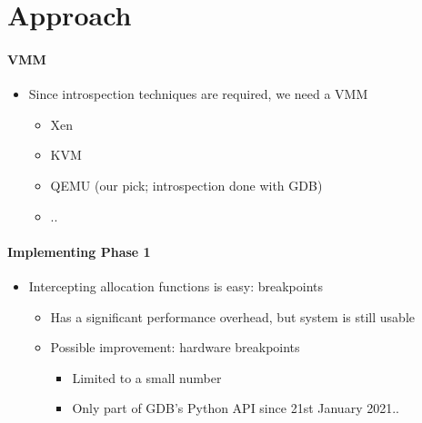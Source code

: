 \documentclass{i20lecture}
\begin{document}
\section{Approach}
\begin{frame}{\insertsection}
  \framesubtitle{VMM}
  
  \begin{itemize}
   \item Since introspection techniques are required, we need a VMM
\pause
    \begin{itemize}
    \item Xen
    \item KVM
    \item QEMU (our pick; introspection done with GDB)
    \item ..
    \end{itemize}
  \end{itemize}
\end{frame}

\begin{frame}{\insertsection}
  \framesubtitle{Implementing Phase 1}
    
    \begin{itemize}
     \item Intercepting allocation functions is easy: breakpoints
     \begin{itemize}
\pause
      \item Has a significant performance overhead, but system is still usable
\pause
      \item Possible improvement: hardware breakpoints
\pause
        \begin{itemize}
            \item Limited to a small number
\pause
            \item Only part of GDB's Python API since 21st January 2021..
        \end{itemize}
     \end{itemize}
    \end{itemize}
\end{frame}
\end{document}
